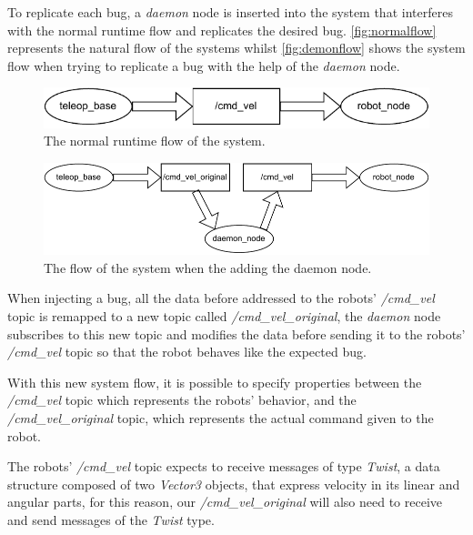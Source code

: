 To replicate each bug, a \textit{daemon} node is inserted into the system that interferes with the normal runtime flow and replicates the desired bug. \autoref{fig:normalflow} represents the natural flow of the systems whilst \autoref{fig:demonflow} shows the system flow when trying to replicate a bug with the help of the \textit{daemon} node.

\begin{figure}[htb]
\includegraphics[width=\textwidth]{images/normal_flow.pdf}
\caption{The normal runtime flow of the system.} \label{fig:normalflow}
\end{figure}
    
\begin{figure}[htb]
\includegraphics[width=\textwidth]{images/demon_flow.pdf}
\caption{The flow of the system when the adding the daemon node.} \label{fig:demonflow}
\end{figure}

When injecting a bug, all the data before addressed to the robots' \textit{/cmd\_vel} topic is remapped to a new topic called \textit{/cmd\_vel\_original}, the \textit{daemon} node subscribes to this new topic and modifies the data before sending it to the robots' \textit{/cmd\_vel} topic so that the robot behaves like the expected bug. 

With this new system flow, it is possible to specify properties between the \textit{/cmd\_vel} topic which represents the robots' behavior, and the \textit{/cmd\_vel\_original} topic, which represents the actual command given to the robot.

The robots' \textit{/cmd\_vel} topic expects to receive messages of type \textit{Twist}, a data structure composed of two \textit{Vector3} objects, that express velocity in its linear and angular parts, for this reason, our \textit{/cmd\_vel\_original} will also need to receive and send messages of the \textit{Twist} type.



